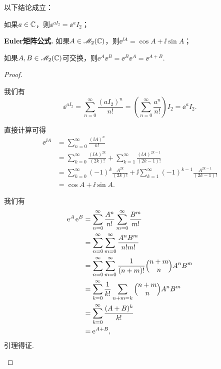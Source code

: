 \begin{lemma}[指数函数的性质.]

以下结论成立：
\begin{enum}
  \item 如果$a\in\mathbb C$，则$\ee^{aI_2}=\ee^aI_2$；
  \item\label{lemma4.1b} {\bfseries Euler矩阵公式.} 如果$A\in\mathscr M_2(
  \mathbb C)$，则$\ee^{\ii A}=\cos A+\ii\sin A$；
  \item\label{lemma4.1c} 如果$A,B\in\mathscr M_2(\mathbb C)$可交换，则$\ee^A\ee^B=\ee^B\ee^A=\ee^{A+B}$.
\end{enum}
\end{lemma}

\begin{proof}
  \begin{inparaenum}[(a)]
    \item 我们有
    \[
      \ee^{aI_2} = \sum_{n=0}^\infty \frac{(aI_2)^n}{n!} = \left(\sum_{n=0}^\infty \frac{a^n}{n!}\right) I_2 = \ee^aI_2.
    \]

    \item 直接计算可得
    \begin{align*}
      \ee^{\ii A} & = \sum_{n=0}^\infty \frac{(\ii A)^n}{n!} \\
      & = \sum_{k=0}^\infty \frac{(\ii A)^{2k}}{(2k)!} + \sum_{k=1}^\infty \frac{(\ii A)^{2k-1}}{(2k-1)!} \\
      & = \sum_{k=0}^\infty (-1)^k\frac{A^{2k}}{(2k)!} + \ii
      \sum_{k=1}^\infty (-1)^{k-1}\frac{A^{2k-1}}{(2k-1)!} \\
      & = \cos A + \ii \sin A.
    \end{align*}

    \item 我们有
    \begin{align*}
      \ee^A\ee^B & = \sum_{n=0}^\infty \frac{A^n}{n!} \sum_{m=0}^\infty \frac{B^m}{m!} \\
      & = \sum_{n=0}^\infty \sum_{m=0}^\infty \frac{A^nB^m}{n!m!} \\
      & = \sum_{n=0}^\infty\sum_{m=0}^\infty \frac1{(n+m)!}\Binom{n+m}nA^nB^m \\
      & = \sum_{k=0}^\infty \frac1{k!}\sum_{n+m=k} \Binom{n+m}n A^nB^m \\
      & = \sum_{k=0}^\infty \frac{(A+B)^k}{k!} \\
      & = \ee^{A+B},
    \end{align*}
    引理得证.
  \end{inparaenum}
\end{proof}

